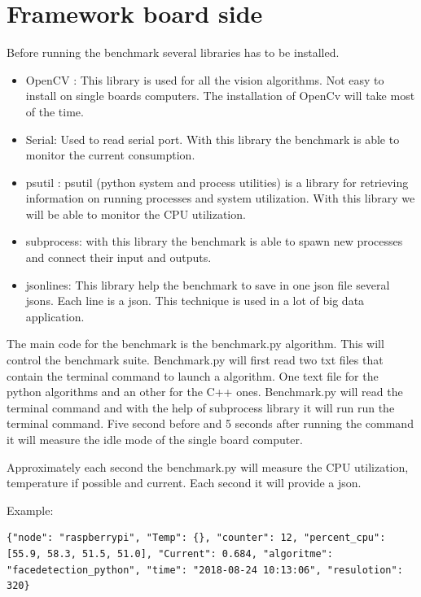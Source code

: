 \documentclass[english]{book_template} %
\begin{document}
  
\section{Framework board side}
Before running the benchmark several libraries has to be installed. 
\begin{itemize}
\item OpenCV : This library is used for all the vision algorithms. Not easy to install on single boards computers. The installation of OpenCv will take most of the time. 
\item Serial: Used to read serial port. With this library the benchmark is able to monitor the current consumption.
\item psutil : psutil (python system and process utilities) is a library for retrieving information on running processes and system utilization. With this library we will be able to monitor the CPU utilization.  %
\item subprocess: with this library the benchmark is able to spawn new processes and connect their input and outputs. 
\item jsonlines: This library help the benchmark to save in one json file several jsons. Each line is a json. This technique is used in a lot of big data application.
\end{itemize}

The main code for the benchmark is the benchmark.py algorithm. This will control the benchmark suite. Benchmark.py will first read two txt files that contain the terminal command to launch a algorithm. One text file for the python algorithms and an other for the C++ ones.
Benchmark.py will read the terminal command and with the help of subprocess library it will run run the terminal command. Five second before and 5 seconds after running the command it will measure the idle mode of the single board computer.

Approximately each second the benchmark.py will measure the CPU utilization, temperature if possible and current. Each second it will provide a json. 

Example:

\begin{lstlisting}
{"node": "raspberrypi", "Temp": {}, "counter": 12, "percent_cpu": [55.9, 58.3, 51.5, 51.0], "Current": 0.684, "algoritme": "facedetection_python", "time": "2018-08-24 10:13:06", "resulotion": 320}
	\end{lstlisting}
\end{document}
